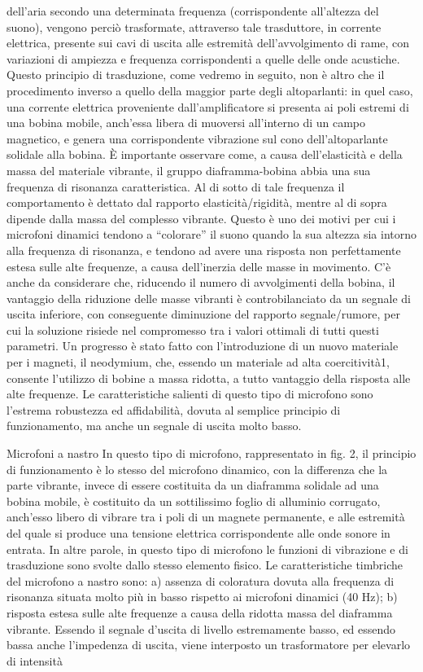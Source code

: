 dell’aria secondo una determinata frequenza (corrispondente all’altezza del suono), vengono perciò trasformate, attraverso tale trasduttore, in corrente elettrica, presente sui cavi di uscita alle estremità dell’avvolgimento di rame, con variazioni di ampiezza e frequenza corrispondenti a quelle delle onde acustiche. Questo principio di trasduzione, come vedremo in seguito, non è altro che il procedimento inverso a quello della maggior parte degli altoparlanti: in quel caso, una corrente elettrica proveniente dall’amplificatore si presenta ai poli estremi di una bobina mobile, anch’essa libera di muoversi all’interno di un campo magnetico, e genera una corrispondente vibrazione sul cono dell’altoparlante solidale alla bobina.
È importante osservare come, a causa dell’elasticità e della massa del materiale vibrante, il gruppo diaframma-bobina abbia una sua frequenza di risonanza caratteristica. Al di sotto di tale frequenza il comportamento è dettato dal rapporto elasticità/rigidità, mentre al di sopra dipende dalla massa del complesso vibrante. Questo è uno dei motivi per cui i microfoni dinamici tendono a “colorare” il suono quando la sua altezza sia intorno alla frequenza di risonanza, e tendono ad avere una risposta non perfettamente estesa sulle alte frequenze, a causa dell’inerzia delle masse in movimento. C’è anche da considerare che, riducendo il numero di avvolgimenti della bobina, il vantaggio della riduzione delle masse vibranti è controbilanciato da un segnale di uscita inferiore, con conseguente diminuzione del rapporto segnale/rumore, per cui la soluzione risiede nel compromesso tra i valori ottimali di tutti questi parametri. Un progresso è stato fatto con l’introduzione di un nuovo materiale per i magneti, il neodymium, che, essendo un materiale ad alta coercitività1, consente l’utilizzo di bobine a massa ridotta, a tutto vantaggio della risposta alle alte frequenze.
Le caratteristiche salienti di questo tipo di microfono sono l’estrema robustezza ed affidabilità, dovuta al semplice principio di funzionamento, ma anche un segnale di uscita molto basso.

Microfoni a nastro
In questo tipo di microfono, rappresentato in fig. 2, il principio di funzionamento è lo stesso del microfono dinamico, con la differenza che la parte vibrante, invece di essere costituita da un diaframma solidale ad una bobina mobile, è costituito da un sottilissimo foglio di alluminio corrugato, anch’esso libero di vibrare tra i poli di un magnete permanente, e alle estremità del quale si produce una tensione elettrica corrispondente alle onde sonore in entrata. In altre parole, in questo tipo di microfono le funzioni di vibrazione e di trasduzione sono svolte dallo stesso elemento fisico. Le caratteristiche timbriche del microfono a nastro sono: a) assenza di coloratura dovuta alla frequenza di risonanza situata molto più in basso rispetto ai microfoni dinamici (40 Hz); b) risposta estesa sulle alte frequenze a causa della ridotta massa del diaframma vibrante. Essendo il segnale d’uscita di livello estremamente basso, ed essendo bassa anche l’impedenza di uscita, viene interposto un trasformatore per elevarlo di intensità

